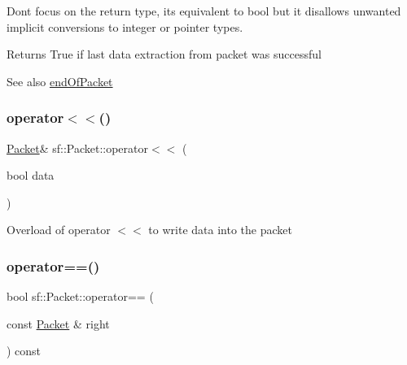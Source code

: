 Don\textquotesingle{}t focus on the return type, it\textquotesingle{}s equivalent to bool but it disallows unwanted implicit conversions to integer or pointer types.

\begin{DoxyReturn}{Returns}
True if last data extraction from packet was successful
\end{DoxyReturn}
\begin{DoxySeeAlso}{See also}
\mbox{\hyperlink{classsf_1_1_packet_a61e354fa670da053907c14b738839560}{end\+Of\+Packet}} \begin{DoxyVerb}\end{DoxyVerb}
 
\end{DoxySeeAlso}
\mbox{\label{classsf_1_1_packet_aa5a465ed02ba29d83ecdafb0ac3fff21}} 
\subsubsection{\texorpdfstring{operator$<$$<$()}{operator<<()}}
{\footnotesize\ttfamily \mbox{\hyperlink{classsf_1_1_packet}{Packet}}\& sf\+::\+Packet\+::operator$<$$<$ (\begin{DoxyParamCaption}\item[{bool}]{data }\end{DoxyParamCaption})}

Overload of operator $<$$<$ to write data into the packet \begin{DoxyVerb}\end{DoxyVerb}
 \mbox{\label{classsf_1_1_packet_aa3136a586a93cde1f54e669b7430dcc9}} 
\subsubsection{\texorpdfstring{operator==()}{operator==()}}
{\footnotesize\ttfamily bool sf\+::\+Packet\+::operator== (\begin{DoxyParamCaption}\item[{const \mbox{\hyperlink{classsf_1_1_packet}{Packet}} \&}]{right }\end{DoxyParamCaption}) const\hspace{0.3cm}{\ttfamily [private]}}

